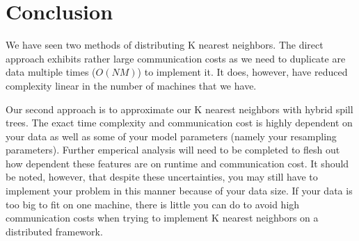 \section{Conclusion}

\vspace{5 mm}
\noindent
We have seen two methods of distributing K nearest neighbors. The direct 
approach exhibits rather large communication costs as we need to duplicate are 
data multiple times ($O(N M)$) to implement it. It does, however, have 
reduced complexity linear in the number of machines that we have. 

\newpage

\vspace{5 mm}
\noindent
Our second approach is to approximate our K nearest neighbors with hybrid spill 
trees. The exact time complexity and communication cost is highly dependent on 
your data as well as some of your model parameters (namely your resampling 
parameters). Further emperical analysis will need to be completed to flesh out 
how dependent these features are on runtime and communication cost. It should 
be noted, however, that despite these uncertainties, you may still have to 
implement your problem in this manner because of your data size. If your data 
is too big to fit on one machine, there is little you can do to avoid high 
communication costs when trying to implement K nearest neighbors on a 
distributed framework.